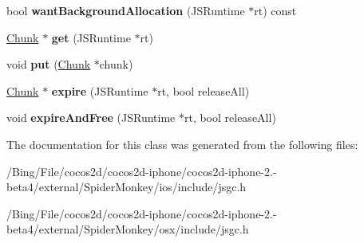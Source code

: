 \begin{DoxyCompactItemize}
\item 
\hypertarget{classjs_1_1gc_1_1_chunk_pool_a4829b5395e5a0b06fb37e70d8c561342}{bool {\bfseries want\-Background\-Allocation} (J\-S\-Runtime $\ast$rt) const }\label{classjs_1_1gc_1_1_chunk_pool_a4829b5395e5a0b06fb37e70d8c561342}

\item 
\hypertarget{classjs_1_1gc_1_1_chunk_pool_a45ec020ee6ff8ac4fb3e693d53dcb066}{\hyperlink{structjs_1_1gc_1_1_chunk}{Chunk} $\ast$ {\bfseries get} (J\-S\-Runtime $\ast$rt)}\label{classjs_1_1gc_1_1_chunk_pool_a45ec020ee6ff8ac4fb3e693d53dcb066}

\item 
\hypertarget{classjs_1_1gc_1_1_chunk_pool_aeed45d739b40644745b736e2c5bd1d0f}{void {\bfseries put} (\hyperlink{structjs_1_1gc_1_1_chunk}{Chunk} $\ast$chunk)}\label{classjs_1_1gc_1_1_chunk_pool_aeed45d739b40644745b736e2c5bd1d0f}

\item 
\hypertarget{classjs_1_1gc_1_1_chunk_pool_af34618bc7f19dd37113d5a01eb001b06}{\hyperlink{structjs_1_1gc_1_1_chunk}{Chunk} $\ast$ {\bfseries expire} (J\-S\-Runtime $\ast$rt, bool release\-All)}\label{classjs_1_1gc_1_1_chunk_pool_af34618bc7f19dd37113d5a01eb001b06}

\item 
\hypertarget{classjs_1_1gc_1_1_chunk_pool_a9402f74591b9b4a738fcac09b2a74271}{void {\bfseries expire\-And\-Free} (J\-S\-Runtime $\ast$rt, bool release\-All)}\label{classjs_1_1gc_1_1_chunk_pool_a9402f74591b9b4a738fcac09b2a74271}

\end{DoxyCompactItemize}


The documentation for this class was generated from the following files\-:\begin{DoxyCompactItemize}
\item 
/\-Bing/\-File/cocos2d/cocos2d-\/iphone/cocos2d-\/iphone-\/2.-\/beta4/external/\-Spider\-Monkey/ios/include/jsgc.\-h\item 
/\-Bing/\-File/cocos2d/cocos2d-\/iphone/cocos2d-\/iphone-\/2.-\/beta4/external/\-Spider\-Monkey/osx/include/jsgc.\-h\end{DoxyCompactItemize}
